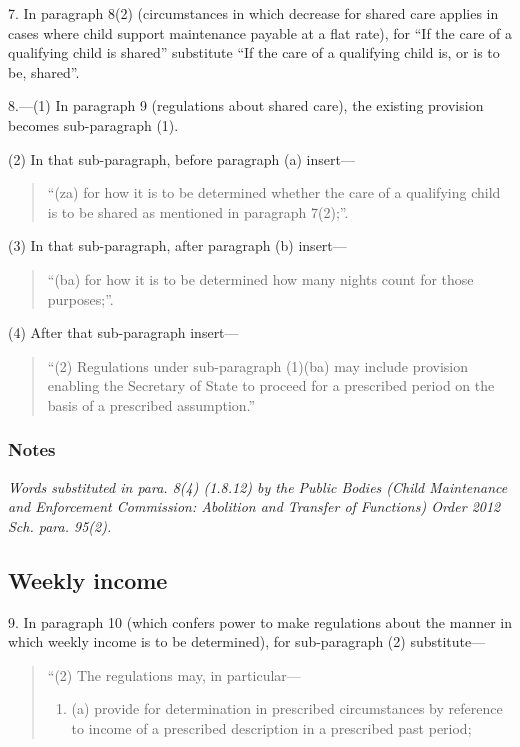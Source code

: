 \documentclass[a4paper]{article}
\newcommand\amendment[1]{\subsubsection*{Notes}{\itshape\frenchspacing\footnotesize #1 \par}}
\begin{document}
{\medskip

7. In paragraph 8(2) (circumstances in which decrease for shared care applies in cases where child support maintenance payable at a flat rate), for “If the care of a qualifying child is shared” substitute “If the care of a qualifying child is, or is to be, shared”.

\medskip

8.---(1) In paragraph 9 (regulations about shared care), the existing provision becomes sub-paragraph (1).

(2) In that sub-paragraph, before paragraph (a) insert—
\begin{quotation}
“(za) for how it is to be determined whether the care of a qualifying child is to be shared as mentioned in paragraph 7(2);”.
\end{quotation}

(3) In that sub-paragraph, after paragraph (b) insert—
\begin{quotation}
“(ba) for how it is to be determined how many nights count for those purposes;”.
\end{quotation}

(4) After that sub-paragraph insert—
\begin{quotation}
“(2) Regulations under sub-paragraph (1)(ba) may include provision enabling the 
Secretary of State
to proceed for a prescribed period on the basis of a prescribed assumption.”
\end{quotation}

\amendment{
Words substituted in para. 8(4) (1.8.12) by the Public Bodies (Child Maintenance and Enforcement Commission: Abolition and Transfer of Functions) Order 2012 Sch. para. 95(2).


}


\subsection*{Weekly income}

9. In paragraph 10 (which confers power to make regulations about the manner in which weekly income is to be determined), for sub-paragraph (2) substitute—
\begin{quotation}
“(2) The regulations may, in particular—
\begin{enumerate}\item[]
(a) provide for determination in prescribed circumstances by reference to income of a prescribed description in a prescribed past period;


\end{enumerate}
\end{quotation}}
\end{document}
